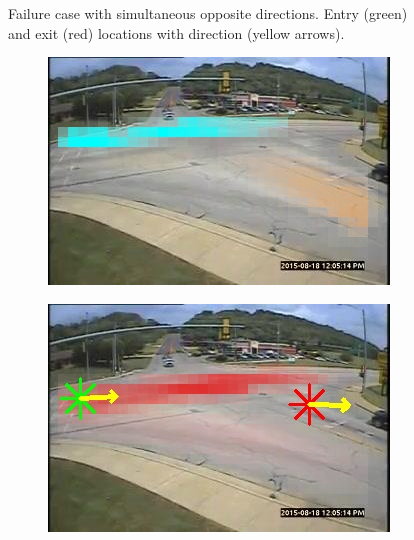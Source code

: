 \begin{figure}
\begin{subfigure}{0.32\linewidth}
        \end{subfigure}
        \caption{Failure case with simultaneous opposite directions. Entry (green) and exit (red) locations with direction (yellow arrows).}
        \label{fig:entry-exit-fail-1}
\end{figure}
\begin{figure}
    \centering
        \begin{subfigure}{0.32\linewidth}
            \includegraphics[width=\linewidth]{./img/scene_learning/res/251950/251950-0.jpg}
        \end{subfigure}
        \begin{subfigure}{0.32\linewidth}
            \includegraphics[width=\linewidth]{./img/scene_learning/res/251950/251950-1.jpg}
        \end{subfigure}


\end{figure}
